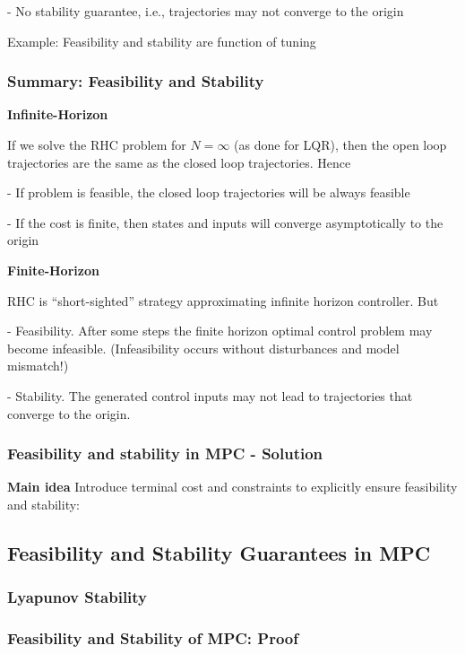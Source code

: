 - No stability guarantee, i.e., trajectories may not converge to the origin

Example: Feasibility and stability are function of tuning

\subsubsection{Summary: Feasibility and Stability}

\textbf{Infinite-Horizon}

If we solve the RHC problem for $N = \infty$ (as done for LQR), then the
open loop trajectories are the same as the closed loop trajectories. Hence

- If problem is feasible, the closed loop trajectories will be always feasible

- If the cost is finite, then states and inputs will converge asymptotically to
the origin

\textbf{Finite-Horizon}

RHC is “short-sighted” strategy approximating infinite horizon controller.
But

- Feasibility. After some steps the finite horizon optimal control problem
may become infeasible. (Infeasibility occurs without disturbances and
model mismatch!)

- Stability. The generated control inputs may not lead to trajectories that
converge to the origin.

\subsubsection{Feasibility and stability in MPC - Solution}

\textbf{Main idea} Introduce terminal cost and constraints to explicitly ensure
feasibility and stability:


\subsection{Feasibility and Stability Guarantees in MPC}

\subsubsection{Lyapunov Stability}


\subsubsection{Feasibility and Stability of MPC: Proof}

